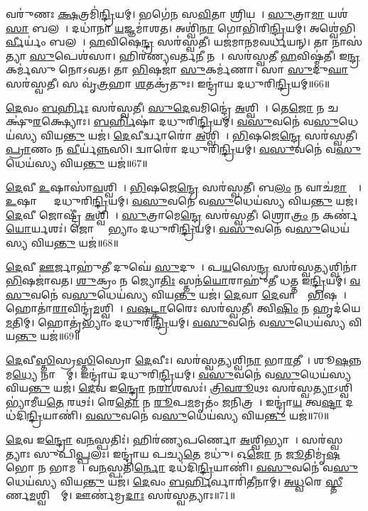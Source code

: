 𑌵𑌰𑍁॑𑌣𑌃 \ul{𑌕𑍍𑌷}𑌤𑍍𑌰𑌮𑌿॑\ul{𑌨𑍍𑌦𑍍𑌰𑌿}𑌯𑌮𑍍।
𑌭𑌗𑍇॑𑌨 𑌸\ul{𑌵𑌿}𑌤𑌾 𑌶𑍍𑌰𑌿𑌯𑌮𑍍᳚।
\ul{𑌸𑍁}𑌤𑍍𑌰𑌾\ul{𑌮𑌾} 𑌯𑌶॑\ul{𑌸𑌾} 𑌬𑌲𑌮𑍍᳚।
𑌦𑌧𑌾॑𑌨𑌾 \ul{𑌯}𑌜𑍍𑌞𑌮𑌾॑𑌶𑌤।
𑌅𑌶𑍍𑌵𑌿॑\ul{𑌨𑌾} 𑌗𑍋𑌭𑌿॑𑌰𑌿\ul{𑌨𑍍𑌦𑍍𑌰𑌿}𑌯𑌮𑍍।
𑌅𑌶𑍍𑌵𑍇॑𑌭𑌿\ul{𑌰𑍍𑌵𑍀}𑌰𑍍𑌯𑌂॑ 𑌬𑌲𑌮𑍍᳚।
\ul{𑌹}𑌵𑌿𑌷𑍇\ul{𑌨𑍍𑌦𑍍𑌰}\ul{} 𑌸𑌰॑𑌸𑍍𑌵𑌤𑍀।
𑌯𑌜॑𑌮𑌾𑌨𑌮𑌵𑌰𑍍𑌧𑌯𑌨𑍍।
𑌤𑌾 𑌨𑌾𑌸॑𑌤𑍍𑌯𑌾 \ul{𑌸𑍁}𑌪𑍇𑌶॑𑌸𑌾।
𑌹𑌿𑌰॑𑌣𑍍𑌯𑌵𑌰𑍍𑌤\ul{𑌨𑍀} 𑌨𑌰𑌾᳚।
𑌸𑌰॑𑌸𑍍𑌵𑌤𑍀 \ul{𑌹}𑌵𑌿𑌷𑍍𑌮॑𑌤𑍀।
𑌇\ul{𑌨𑍍𑌦𑍍𑌰} 𑌕𑌰𑍍𑌮॑𑌸𑍁 𑌨𑍋𑌽𑌵𑌤।
𑌤𑌾 \ul{𑌭𑌿}𑌷𑌜𑌾॑ \ul{𑌸𑍁}𑌕𑌰𑍍𑌮॑𑌣𑌾।
𑌸𑌾 \ul{𑌸𑍁}𑌦𑍁\ul{𑌘𑌾} 𑌸𑌰॑𑌸𑍍𑌵𑌤𑍀।
𑌸 𑌵𑍃॑\ul{𑌤𑍍𑌰}𑌹𑌾 \ul{𑌶}𑌤𑌕𑍍𑌰॑𑌤𑍁𑌃।
𑌇𑌨𑍍𑌦𑍍𑌰𑌾॑𑌯 𑌦𑌧𑍁𑌰𑌿\ul{𑌨𑍍𑌦𑍍𑌰𑌿}𑌯𑌮𑍍॥66॥\anuvakamend[\ul{𑌉}𑌭𑌾 𑌸𑌰॑𑌸𑍍𑌵\ul{𑌤𑍀} 𑌬𑌲॑𑌮𑌿\ul{𑌨𑍍𑌦𑍍𑌰𑌿}𑌯𑌨𑍍𑌨\ul{𑌰𑌾} 𑌷𑌟𑍍𑌚॑]

\ul{𑌦𑍇}𑌵𑌂 \ul{𑌬}\ul{𑌰𑍍}𑌹𑌿𑌃 𑌸𑌰॑𑌸𑍍𑌵𑌤𑍀।
\ul{𑌸𑍁}\ul{𑌦𑍇}𑌵𑌮𑌿𑌨𑍍𑌦𑍍𑌰𑍇॑ \ul{𑌅}𑌶𑍍𑌵𑌿𑌨𑌾᳚।
𑌤𑍇\ul{𑌜𑍋} 𑌨 𑌚𑌕𑍍𑌷𑍁॑\ul{𑌰}𑌕𑍍𑌷𑍍𑌯𑍋𑌃।
\ul{𑌬}\ul{𑌰𑍍}𑌹𑌿𑌷𑌾॑ 𑌦𑌧𑍁𑌰𑌿\ul{𑌨𑍍𑌦𑍍𑌰𑌿}𑌯𑌮𑍍।
\ul{𑌵}\ul{𑌸𑍁}𑌵𑌨𑍇॑ 𑌵\ul{𑌸𑍁}𑌧𑍇𑌯॑𑌸𑍍𑌯 𑌵𑌿𑌯\ul{𑌨𑍍𑌤𑍁} 𑌯𑌜॑।
\ul{𑌦𑍇}𑌵𑍀𑌰𑍍𑌦𑍍𑌵𑌾𑌰𑍋॑ \ul{𑌅}𑌶𑍍𑌵𑌿𑌨𑌾᳚।
\ul{𑌭𑌿}𑌷𑌜𑍇\ul{𑌨𑍍𑌦𑍍𑌰𑍇} 𑌸𑌰॑𑌸𑍍𑌵𑌤𑍀।
\ul{𑌪𑍍𑌰𑌾}𑌣𑌂 𑌨 \ul{𑌵𑍀}𑌰𑍍𑌯॑\ul{𑌨𑍍𑌨}𑌸𑌿।
𑌦𑍍𑌵𑌾𑌰𑍋॑ 𑌦𑌧𑍁𑌰𑌿\ul{𑌨𑍍𑌦𑍍𑌰𑌿}𑌯𑌮𑍍।
\ul{𑌵}\ul{𑌸𑍁}𑌵𑌨𑍇॑ 𑌵\ul{𑌸𑍁}𑌧𑍇𑌯॑𑌸𑍍𑌯 𑌵𑌿𑌯\ul{𑌨𑍍𑌤𑍁} 𑌯𑌜॑॥67॥

\ul{𑌦𑍇}𑌵𑍀 \ul{𑌉}𑌷𑌾𑌸𑌾॑\ul{𑌵}𑌶𑍍𑌵𑌿𑌨𑌾᳚।
\ul{𑌭𑌿}𑌷𑌜𑍇\ul{𑌨𑍍𑌦𑍍𑌰𑍇} 𑌸𑌰॑𑌸𑍍𑌵𑌤𑍀।
𑌬\ul{𑌲𑌂} 𑌨 𑌵𑌾𑌚॑\ul{𑌮𑌾}𑌸𑍍𑌯𑍇᳚।
\ul{𑌉}𑌷𑌾𑌭𑍍𑌯𑌾𑌂᳚ 𑌦𑌧𑍁𑌰𑌿\ul{𑌨𑍍𑌦𑍍𑌰𑌿}𑌯𑌮𑍍।
\ul{𑌵}\ul{𑌸𑍁}𑌵𑌨𑍇॑ 𑌵\ul{𑌸𑍁}𑌧𑍇𑌯॑𑌸𑍍𑌯 𑌵𑌿𑌯\ul{𑌨𑍍𑌤𑍁} 𑌯𑌜॑।
\ul{𑌦𑍇}𑌵𑍀 𑌜𑍋𑌷𑍍𑌟𑍍𑌰𑍀॑ \ul{𑌅}𑌶𑍍𑌵𑌿𑌨𑌾᳚।
\ul{𑌸𑍁}𑌤𑍍𑌰𑌾𑌮𑍇\ul{𑌨𑍍𑌦𑍍𑌰𑍇} 𑌸𑌰॑𑌸𑍍𑌵𑌤𑍀।
𑌶𑍍𑌰𑍋\ul{𑌤𑍍𑌰𑌂} 𑌨 𑌕𑌰𑍍𑌣॑\ul{𑌯𑍋}𑌰𑍍𑌯𑌶𑌃॑।
𑌜𑍋𑌷𑍍𑌟𑍍𑌰𑍀᳚𑌭𑍍𑌯𑌾𑌂 𑌦𑌧𑍁𑌰𑌿\ul{𑌨𑍍𑌦𑍍𑌰𑌿}𑌯𑌮𑍍।
\ul{𑌵}\ul{𑌸𑍁}𑌵𑌨𑍇॑ 𑌵\ul{𑌸𑍁}𑌧𑍇𑌯॑𑌸𑍍𑌯 𑌵𑌿𑌯\ul{𑌨𑍍𑌤𑍁} 𑌯𑌜॑॥68॥

\ul{𑌦𑍇}𑌵𑍀 \ul{𑌊}𑌰𑍍𑌜𑌾𑌹𑍁॑\ul{𑌤𑍀} 𑌦𑍁𑌘𑍇॑ \ul{𑌸𑍁}𑌦𑍁𑌘𑍇᳚।
𑌪\ul{𑌯}𑌸𑍇\ul{𑌨𑍍𑌦𑍍𑌰}\ul{} 𑌸𑌰॑𑌸𑍍𑌵\ul{𑌤𑍍𑌯}𑌶𑍍𑌵𑌿𑌨𑌾॑ \ul{𑌭𑌿}𑌷𑌜𑌾॑𑌵𑌤।
\ul{𑌶𑍁}𑌕𑍍𑌰𑌂 𑌨 𑌜𑍍𑌯𑍋\ul{𑌤𑌿𑌃} 𑌸𑍍𑌤𑌨॑\ul{𑌯𑍋}𑌰𑌾𑌹𑍁॑𑌤𑍀 𑌧𑌤𑍍𑌤 𑌇\ul{𑌨𑍍𑌦𑍍𑌰𑌿}𑌯𑌮𑍍।
\ul{𑌵}\ul{𑌸𑍁}𑌵𑌨𑍇॑ 𑌵\ul{𑌸𑍁}𑌧𑍇𑌯॑𑌸𑍍𑌯 𑌵𑌿𑌯\ul{𑌨𑍍𑌤𑍁} 𑌯𑌜॑।
\ul{𑌦𑍇}𑌵𑌾 \ul{𑌦𑍇}𑌵𑌾𑌨𑌾𑌂᳚ \ul{𑌭𑌿}𑌷𑌜𑌾᳚।
𑌹𑍋𑌤𑌾॑\ul{𑌰𑌾}𑌵𑌿𑌨𑍍𑌦𑍍𑌰॑\ul{𑌮}𑌶𑍍𑌵𑌿𑌨𑌾᳚।
\ul{𑌵}\ul{𑌷}\ul{𑌟𑍍𑌕𑌾}𑌰𑍈𑌃 𑌸𑌰॑𑌸𑍍𑌵𑌤𑍀।
𑌤𑍍𑌵𑌿\ul{𑌷𑌿𑌂} 𑌨 𑌹𑍃𑌦॑𑌯𑍇 \ul{𑌮}𑌤𑌿𑌮𑍍।
𑌹𑍋𑌤𑍃॑𑌭𑍍𑌯𑌾𑌂 𑌦𑌧𑍁𑌰𑌿\ul{𑌨𑍍𑌦𑍍𑌰𑌿}𑌯𑌮𑍍।
\ul{𑌵}\ul{𑌸𑍁}𑌵𑌨𑍇॑ 𑌵\ul{𑌸𑍁}𑌧𑍇𑌯॑𑌸𑍍𑌯 𑌵𑌿𑌯\ul{𑌨𑍍𑌤𑍁} 𑌯𑌜॑॥69॥

\ul{𑌦𑍇}𑌵𑍀\ul{𑌸𑍍𑌤𑌿}𑌸𑍍𑌰\ul{𑌸𑍍𑌤𑌿}𑌸𑍍𑌰𑍋 \ul{𑌦𑍇}𑌵𑍀𑌃।
𑌸𑌰॑𑌸𑍍𑌵\ul{𑌤𑍍𑌯}𑌶𑍍𑌵𑌿\ul{𑌨𑌾} 𑌭𑌾\ul{𑌰}𑌤𑍀𑌡𑌾᳚।
𑌶𑍂\ul{𑌷}𑌨𑍍𑌨 𑌮\ul{𑌧𑍍𑌯𑍇} 𑌨𑌾𑌭𑍍𑌯𑌾᳚𑌮𑍍।
𑌇𑌨𑍍𑌦𑍍𑌰𑌾॑𑌯 𑌦𑌧𑍁𑌰𑌿\ul{𑌨𑍍𑌦𑍍𑌰𑌿}𑌯𑌮𑍍।
\ul{𑌵}\ul{𑌸𑍁}𑌵𑌨𑍇॑ 𑌵\ul{𑌸𑍁}𑌧𑍇𑌯॑𑌸𑍍𑌯 𑌵𑌿𑌯\ul{𑌨𑍍𑌤𑍁} 𑌯𑌜॑।
\ul{𑌦𑍇}𑌵 𑌇\ul{𑌨𑍍𑌦𑍍𑌰𑍋} 𑌨\ul{𑌰𑌾}𑌶𑌸𑌃॑।
\ul{𑌤𑍍𑌰𑌿}\ul{𑌵}\ul{𑌰𑍂}𑌥𑌃 𑌸𑌰॑𑌸𑍍𑌵\ul{𑌤𑍍𑌯𑌾}\-𑌽𑌶𑍍𑌵𑌿𑌭𑍍𑌯𑌾॑𑌮𑍀𑌯\ul{𑌤𑍇} 𑌰𑌥𑌃॑।
𑌰𑍇\ul{𑌤𑍋} 𑌨 \ul{𑌰𑍂}𑌪\ul{𑌮}𑌮𑍃𑌤𑌂॑ \ul{𑌜}𑌨𑌿𑌤𑍍𑌰𑌮𑍍᳚।
𑌇𑌨𑍍𑌦𑍍𑌰𑌾॑\ul{𑌯} 𑌤𑍍𑌵\ul{𑌷𑍍𑌟𑌾} 𑌦𑌧॑𑌦𑌿\ul{𑌨𑍍𑌦𑍍𑌰𑌿}𑌯𑌾𑌣𑌿॑।
\ul{𑌵}\ul{𑌸𑍁}𑌵𑌨𑍇॑ 𑌵\ul{𑌸𑍁}𑌧𑍇𑌯॑𑌸𑍍𑌯 𑌵𑌿𑌯\ul{𑌨𑍍𑌤𑍁} 𑌯𑌜॑॥70॥

\ul{𑌦𑍇}𑌵 𑌇\ul{𑌨𑍍𑌦𑍍𑌰𑍋} 𑌵\ul{𑌨}𑌸𑍍𑌪𑌤𑌿𑌃॑।
𑌹𑌿𑌰॑𑌣𑍍𑌯𑌪𑌰𑍍𑌣𑍋 \ul{𑌅}𑌶𑍍𑌵𑌿𑌭𑍍𑌯𑌾𑌮𑍍᳚।
𑌸𑌰॑𑌸𑍍𑌵𑌤𑍍𑌯𑌾𑌃 𑌸𑍁𑌪𑌿\ul{𑌪𑍍𑌪}𑌲𑌃।
𑌇𑌨𑍍𑌦𑍍𑌰𑌾॑𑌯 𑌪𑌚𑍍𑌯\ul{𑌤𑍇} 𑌮𑌧𑍁॑।
𑌓\ul{𑌜𑍋} 𑌨 \ul{𑌜𑍂}𑌤𑌿𑌮𑍃॑\ul{𑌷}𑌭𑍋 𑌨 𑌭𑌾𑌮𑌮𑍍᳚।
𑌵\ul{𑌨}𑌸𑍍𑌪𑌤𑌿॑\ul{𑌰𑍍𑌨𑍋} 𑌦𑌧॑𑌦𑌿\ul{𑌨𑍍𑌦𑍍𑌰𑌿}𑌯𑌾𑌣𑌿॑।
\ul{𑌵}\ul{𑌸𑍁}𑌵𑌨𑍇॑ 𑌵\ul{𑌸𑍁}𑌧𑍇𑌯॑𑌸𑍍𑌯 𑌵𑌿𑌯\ul{𑌨𑍍𑌤𑍁} 𑌯𑌜॑।
\ul{𑌦𑍇}𑌵𑌂 \ul{𑌬}\ul{𑌰𑍍}𑌹𑌿𑌰𑍍𑌵𑌾𑌰𑌿॑𑌤𑍀𑌨𑌾𑌮𑍍।
\ul{𑌅}\ul{𑌧𑍍𑌵}𑌰𑍇 \ul{𑌸𑍍𑌤𑍀}𑌰𑍍𑌣\ul{𑌮}𑌶𑍍𑌵𑌿𑌭𑍍𑌯𑌾᳚𑌮𑍍।
𑌊𑌰𑍍𑌣॑𑌮𑍍𑌰\ul{𑌦𑌾𑌃} 𑌸𑌰॑𑌸𑍍𑌵𑌤𑍍𑌯𑌾𑌃॥71॥

